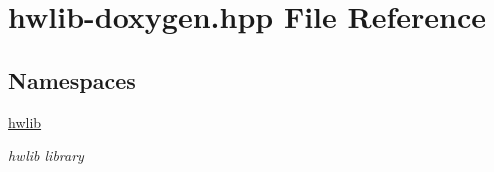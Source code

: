 \hypertarget{hwlib-doxygen_8hpp}{}\section{hwlib-\/doxygen.hpp File Reference}
\label{hwlib-doxygen_8hpp}
\subsection*{Namespaces}
\begin{DoxyCompactItemize}
\item 
 \hyperlink{namespacehwlib}{hwlib}
\begin{DoxyCompactList}\small\item\em hwlib library \end{DoxyCompactList}\end{DoxyCompactItemize}
